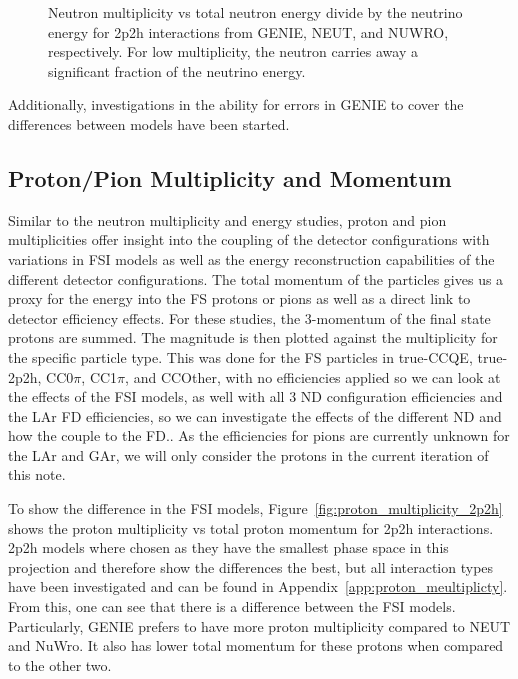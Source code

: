 \documentclass[12pt]{article}
\begin{document}
\begin{figure}
\begin{subfigure}[b]{0.32\textwidth}
\end{subfigure}
\caption{Neutron multiplicity vs total neutron energy divide by the neutrino energy for 2p2h interactions from GENIE, NEUT, and NUWRO, respectively.  For low multiplicity, the neutron carries away a significant fraction of the neutrino energy.} 
\label{fig:Neutron_multi_ene_enu_2p2h_ND}
\end{figure}
\FloatBarrier

 Additionally, investigations in the ability for errors in GENIE to cover the differences between models have been started. 

\subsection{Proton/Pion Multiplicity and Momentum}
\label{subsec:Particle_multiplicities_momentum}

Similar to the neutron multiplicity and energy studies, proton and pion multiplicities offer insight into the coupling of the detector configurations with variations in FSI models as well as the energy reconstruction capabilities of the different detector configurations. 
The total momentum of the particles gives us a proxy for the energy into the FS protons or pions as well as a direct link to detector efficiency effects.  
For these studies, the 3-momentum of the final state protons are summed. 
The magnitude is then plotted against the multiplicity for the specific particle type. 
This was done for the FS particles in true-CCQE, true-2p2h, CC0$\pi$, CC1$\pi$, and CCOther, with no efficiencies applied so we can look at the effects of the FSI models, as well with all 3 ND configuration efficiencies and the LAr FD efficiencies, so we can investigate the effects of the different ND and how the couple to the FD.. 
As the efficiencies for pions are currently unknown for the LAr and GAr, we will only consider the protons in the current iteration of this note. 

To show the difference in the FSI models, Figure~\ref{fig:proton_multiplicity_2p2h} shows the proton multiplicity vs total proton momentum for 2p2h interactions. 
2p2h models where chosen as they have the smallest phase space in this projection and therefore show the differences the best, but all interaction types have been investigated and can be found in Appendix~\ref{app:proton_meultiplicty}.
From this, one can see that there is a difference between the FSI models.  
Particularly, GENIE prefers to have more proton multiplicity compared to NEUT and NuWro.
It also has lower total momentum for these protons when compared to the other two.
 
\end{document}
